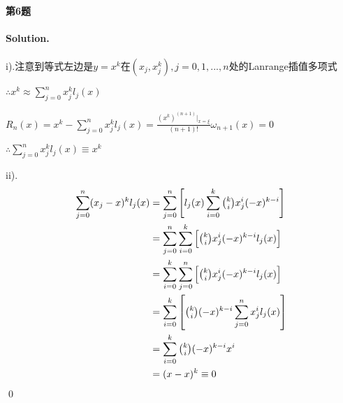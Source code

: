 \documentclass[a4paper]{article}
\newenvironment{solution}
{\color{blue} \paragraph{Solution.}}
{\newline \qed}
\begin{document}
	\paragraph{第6题}
\begin{solution}
		i).注意到等式左边是$y=x^k$在$(x_j, x_j^k), j=0,1,...,n$处的Lanrange插值多项式
	
	$\therefore x^k\approx \sum\limits_{j=0}^{n}x_j^kl_j(x)$
	
	$R_n(x) = x^k - \sum\limits_{j=0}^{n}x_j^kl_j(x) = \frac{(x^k)^{(n+1)}|_{x=\xi}}{(n+1)!}\omega_{n+1}(x) = 0$
	
	$\therefore \sum\limits_{j=0}^{n}x_j^kl_j(x)\equiv x^k$
	
	ii).\begin{equation*}
		\begin{aligned}
			\sum\limits_{j=0}^{n} (x_j-x)^kl_j(x) &= \sum\limits_{j=0}^{n}\left[ l_j(x)\sum\limits_{i=0}^{k}\tbinom{k}{i}x_j^{i}(-x)^{k-i} \right] \\
			&= \sum\limits_{j=0}^{n} \sum\limits_{i=0}^{k} \left[\tbinom{k}{i}x_j^{i}(-x)^{k-i}l_j(x)\right] \\
			&= \sum\limits_{i=0}^{k} \sum\limits_{j=0}^{n} \left[\tbinom{k}{i}x_j^{i}(-x)^{k-i}l_j(x)\right] \\ 
			&= \sum\limits_{i=0}^{k} \left[\tbinom{k}{i}(-x)^{k-i}\sum\limits_{j=0}^{n}x_j^{i}l_j(x)\right]\\ 
			&= \sum\limits_{i=0}^{k} \tbinom{k}{i}(-x)^{k-i}x^{i} \\
			&= (x-x)^{k}\equiv 0\\
		\end{aligned}
	\end{equation*}
\end{solution}
\end{document}

